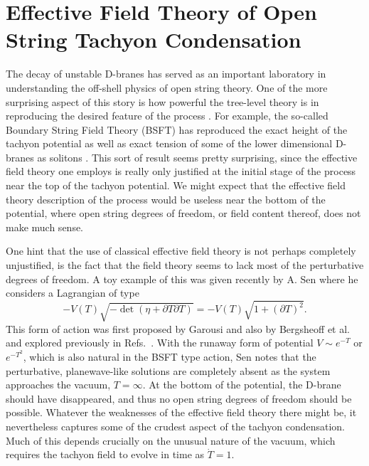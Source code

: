 \documentclass[a4paper,12pt]{article}
\begin{document}
\pagebreak
\renewcommand{\thepage}{\arabic{page}}
\pagebreak

\setcounter{equation}{0}

\section{Effective Field Theory of Open String Tachyon Condensation}

The decay of unstable D-branes \cite{DaD} has served as an important
laboratory  
in understanding the  off-shell physics of open string theory. One of
the  more
surprising aspect of this story is how powerful the tree-level
theory is in reproducing the desired feature of the process \cite{emil}. 
For example, the 
so-called Boundary String Field Theory (BSFT) \cite{BSFT, BSFTo} 
has reproduced the exact height of the tachyon potential as 
well as exact tension of some of the lower dimensional D-branes as 
solitons \cite{GS, kutasov}. 
This sort of result seems pretty surprising, since the effective
field theory one employs is really only  justified at the initial stage 
of the process near the top of the tachyon potential. We might expect
 that the effective field theory description of
the process would be useless near the bottom of the potential, 
where open string degrees of freedom, or field content thereof, 
does not make much sense. 

One hint that the use of classical effective field theory is not perhaps 
completely unjustified, is the fact that the field theory seems
to lack most of the  perturbative degrees of freedom. A toy example
of this was given recently by A. Sen \cite{rolling} where he considers a 
Lagrangian of type
\begin{equation}
-V(T)\sqrt{-\det(\eta+\partial T\partial T)}
=-V(T)\sqrt{1+(\partial T)^2}.
\end{equation}
This form of action was first proposed by Garousi and also by 
Bergsheoff et al.\cite{bergshoeff} and 
explored previously in Refs.\ \cite{kluson,fluid}.
With the runaway form of potential $V\sim e^{-T}$ or $e^{-T^2}$,
which is also natural in the BSFT type action,
Sen notes that the perturbative, planewave-like solutions are completely
absent as the system approaches the vacuum, $T=\infty$. At the bottom
of the potential, the D-brane should have disappeared, and thus no
open string degrees of freedom should be possible. Whatever the 
weaknesses  of
the effective field theory there might be, it nevertheless  captures
some of 
the crudest aspect of the tachyon condensation. Much of this depends
crucially on the unusual nature of the vacuum, which requires the
tachyon field to evolve in time as $\dot T=1$.
\end{document}
